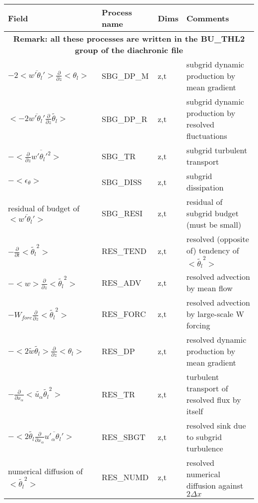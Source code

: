 \begingroup
\renewcommand\arraystretch{1.5}
\begin{longtable}[c]{|p{}|p{}|p{}|p{}|}
\hline
Field & Process name & Dims & Comments \\
\hline \hline
\endhead
\multicolumn{4}{|c|}{\textbf{Remark: all these processes are written in the BU\_THL2 group of the diachronic file}} \\
\hline
\endfoot
$- 2 <\overline{w'\theta_l'}>\frac{\partial }{\partial z}<\theta_l>$     & SBG\_DP\_M & z,t & subgrid dynamic production by mean gradient \\\hline
$<-2 \overline{w'\theta_l'}\frac{\partial}{\partial z}\tilde{\theta_l}>$ & SBG\_DP\_R & z,t & subgrid dynamic production by resolved fluctuations\\\hline
$-<\frac{\partial}{\partial z}\overline{w'\theta_l'^2}>$                 & SBG\_TR    & z,t & subgrid turbulent transport\\\hline
$-<\epsilon_\theta>$                                                     & SBG\_DISS  & z,t & subgrid dissipation \\\hline
{\rm residual of budget of} $<\overline{w'\theta_l'}>$                   & SBG\_RESI  & z,t & residual of subgrid budget (must be small) \\\hline
$-\frac{\partial }{\partial t}<\tilde{\theta_l}^2>$                      & RES\_TEND  & z,t & resolved (opposite of) tendency of $<\tilde{\theta_l}^2>$\\\hline
$-<w>\frac{\partial}{\partial z}<\tilde{\theta_l}^2>$                    & RES\_ADV   & z,t & resolved advection by mean flow \\\hline
$-W_{forc}\frac{\partial}{\partial z}<\tilde{\theta_l}^2>$               & RES\_FORC  & z,t & resolved advection by large-scale W forcing \\\hline
$-< 2 \tilde{w}\tilde{\theta_l}>\frac{\partial }{\partial z}<\theta_l>$  & RES\_DP    & z,t & resolved dynamic production by mean gradient \\\hline
$-\frac{\partial}{\partial x_\alpha} <\tilde{u_\alpha} \tilde{\theta_l}^2>$ & RES\_TR & z,t & turbulent transport of resolved flux by itself \\\hline
$- <2 \tilde{\theta_l}\frac{\partial}{\partial x_\alpha}\overline{u'_\alpha \theta_l'}>$ & RES\_SBGT & z,t & resolved sink due to subgrid turbulence \\\hline
{\rm numerical diffusion of } $<\tilde{\theta_l}^2>$                     & RES\_NUMD  & z,t & resolved numerical diffusion against $2\Delta x$ \\\hline

\end{longtable}
